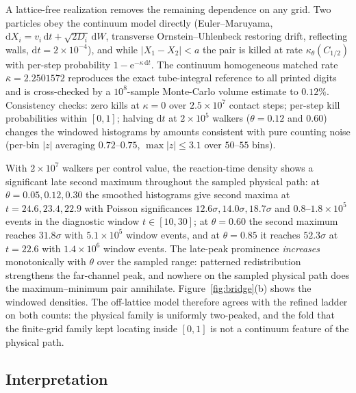\documentclass[aps,pre,reprint,amsmath,amssymb,longbibliography,floatfix]{revtex4-2}
\newcommand{\dd}{\mathrm d}
\newcommand{\e}{\mathrm e}
\begin{document}
A lattice-free realization removes the remaining dependence on any grid.
Two particles obey the continuum model directly
(Euler--Maruyama, \(\dd X_i=v_i\,\dd t+\sqrt{2D_i}\,\dd W\),
transverse Ornstein--Uhlenbeck restoring drift, reflecting walls,
\(\dd t=2\times10^{-4}\)), and while \(|X_1-X_2|<a\) the pair is killed at
rate \(\kappa_\theta(C_{1/2})\) with per-step probability
\(1-\e^{-\kappa\,\dd t}\). The continuum homogeneous matched rate
\(\bar\kappa=2.2501572\) reproduces the exact tube-integral reference to
all printed digits and is cross-checked by a \(10^8\)-sample Monte-Carlo
volume estimate to \(0.12\%\). Consistency checks: zero kills at
\(\kappa=0\) over \(2.5\times10^7\) contact steps; per-step kill
probabilities within \([0,1]\); halving \(\dd t\) at \(2\times10^5\) walkers
(\(\theta=0.12\) and \(0.60\)) changes the windowed histograms by amounts
consistent with pure counting noise (per-bin \(|z|\) averaging
\(0.72\)--\(0.75\), \(\max|z|\le3.1\) over \(50\)--\(55\) bins).

With \(2\times10^7\) walkers per control value, the reaction-time density
shows a significant late second maximum throughout the sampled physical
path: at \(\theta=0.05,0.12,0.30\) the smoothed
histograms give second maxima at \(t=24.6,23.4,22.9\) with Poisson
significances \(12.6\sigma,14.0\sigma,18.7\sigma\) and
\(0.8\)--\(1.8\times10^5\) events in the diagnostic window
\(t\in[10,30]\); at \(\theta=0.60\) the second maximum reaches
\(31.8\sigma\) with \(5.1\times10^5\) window events, and at
\(\theta=0.85\) it reaches \(52.3\sigma\) at \(t=22.6\) with
\(1.4\times10^6\) window events. The late-peak
prominence \emph{increases} monotonically with \(\theta\) over the sampled
range: patterned redistribution strengthens the far-channel peak, and
nowhere on the sampled physical path does the maximum--minimum pair
annihilate. Figure~\ref{fig:bridge}(b) shows the windowed densities. The off-lattice
model therefore agrees with the refined ladder
on both counts: the physical family is uniformly two-peaked, and the fold
that the finite-grid family kept locating inside \([0,1]\) is not a
continuum feature of the physical path.

\subsection{Interpretation}
\label{sec:bridge-interpretation}
\end{document}
